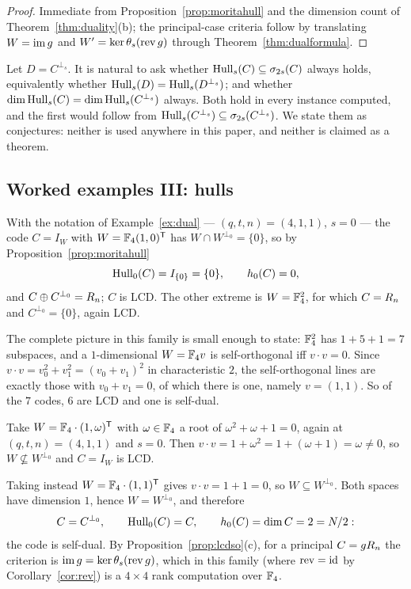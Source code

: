 \begin{proof}
Immediate from Proposition~\ref{prop:moritahull} and the dimension count of
Theorem~\ref{thm:duality}(b); the principal-case criteria follow by translating
$W=\operatorname{im} g$ and $W'=\ker\theta_s(\operatorname{rev} g)$ through
Theorem~\ref{thm:dualformula}.
\end{proof}

\begin{remark}
Let $D=C^{\perp_s}$. It is natural to ask whether
$\operatorname{Hull}_s(C)\subseteq\sigma_{2s}(C)$ always holds, equivalently whether
$\operatorname{Hull}_s(D)=\operatorname{Hull}_s(D^{\perp_s})$; and whether
$\dim\operatorname{Hull}_s(C)=\dim\operatorname{Hull}_s(C^{\perp_s})$ always. Both hold in every instance
computed, and the first would follow from $\operatorname{Hull}_s(C^{\perp_s})\subseteq
\sigma_{2s}(C^{\perp_s})$. We state them as conjectures: neither is used
anywhere in this paper, and neither is claimed as a theorem.
\end{remark}

\subsection{Worked examples III: hulls}

\begin{example}\label{ex:lcd}
With the notation of Example~\ref{ex:dual} --- $(q,t,n)=(4,1,1)$, $s=0$ --- the
code $C=I_W$ with $W=\mathbb F_4(1,0)^{\mathsf T}$ has $W\cap W^{\perp_0}=\{0\}$, so
by Proposition~\ref{prop:moritahull}
\[
  \operatorname{Hull}_0(C)=I_{\{0\}}=\{0\},\qquad h_0(C)=0,
\]
and $C\oplus C^{\perp_0}=R_n$; $C$ is LCD. The other extreme is $W=\mathbb F_4^2$, for
which $C=R_n$ and $C^{\perp_0}=\{0\}$, again LCD.

The complete picture in this family is small enough to state: $\mathbb F_4^2$ has
$1+5+1=7$ subspaces, and a $1$-dimensional $W=\mathbb F_4v$ is self-orthogonal iff
$v\cdot v=0$. Since $v\cdot v=v_0^2+v_1^2=(v_0+v_1)^2$ in characteristic $2$,
the self-orthogonal lines are exactly those with $v_0+v_1=0$, of which there is
one, namely $v=(1,1)$. So of the $7$ codes, $6$ are LCD and one is self-dual.
\end{example}

\begin{example}\label{ex:sd}
Take $W=\mathbb F_4\cdot(1,\omega)^{\mathsf T}$ with $\omega\in\mathbb F_4$ a root of
$\omega^2+\omega+1=0$, again at $(q,t,n)=(4,1,1)$ and $s=0$. Then
$v\cdot v=1+\omega^2=1+(\omega+1)=\omega\ne0$, so $W\nsubseteq W^{\perp_0}$
and $C=I_W$ is LCD.

Taking instead $W=\mathbb F_4\cdot(1,1)^{\mathsf T}$ gives $v\cdot v=1+1=0$, so
$W\subseteq W^{\perp_0}$. Both spaces have dimension $1$, hence
$W=W^{\perp_0}$, and therefore
\[
  C=C^{\perp_0},\qquad \operatorname{Hull}_0(C)=C,\qquad h_0(C)=\dim C=2=N/2 :
\]
the code is self-dual. By Proposition~\ref{prop:lcdso}(c), for a principal
$C=gR_n$ the criterion is $\operatorname{im} g=\ker\theta_s(\operatorname{rev} g)$, which in this family
(where $\operatorname{rev}=\mathrm{id}$ by Corollary~\ref{cor:rev}) is a $4\times4$ rank
computation over $\mathbb F_4$.
\end{example}

